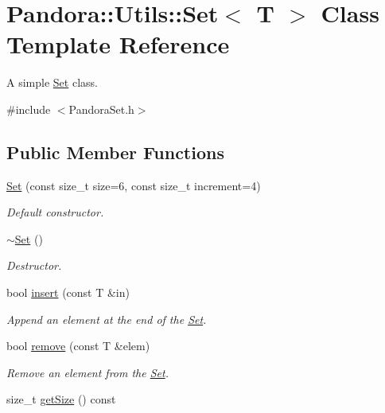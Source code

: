 \hypertarget{classPandora_1_1Utils_1_1Set}{
\section{Pandora::Utils::Set$<$ T $>$ Class Template Reference}
\label{classPandora_1_1Utils_1_1Set}
}


A simple \hyperlink{classPandora_1_1Utils_1_1Set}{Set} class.  


{\ttfamily \#include $<$PandoraSet.h$>$}\subsection*{Public Member Functions}
\begin{DoxyCompactItemize}
\item 
\hyperlink{classPandora_1_1Utils_1_1Set_ad0e4e02f649fcefffe61115758e1261c}{Set} (const size\_\-t size=6, const size\_\-t increment=4)
\begin{DoxyCompactList}\small\item\em Default constructor. \item\end{DoxyCompactList}\item 
\hyperlink{classPandora_1_1Utils_1_1Set_a51d05d5d31cb8c16b510262737969f0e}{$\sim$Set} ()
\begin{DoxyCompactList}\small\item\em Destructor. \item\end{DoxyCompactList}\item 
bool \hyperlink{classPandora_1_1Utils_1_1Set_a2c43d731fac0319a5be8c055aae33c8b}{insert} (const T \&in)
\begin{DoxyCompactList}\small\item\em Append an element at the end of the \hyperlink{classPandora_1_1Utils_1_1Set}{Set}. \item\end{DoxyCompactList}\item 
bool \hyperlink{classPandora_1_1Utils_1_1Set_a5094548bb7e9ac74ebc29ae0c4f426a5}{remove} (const T \&elem)
\begin{DoxyCompactList}\small\item\em Remove an element from the \hyperlink{classPandora_1_1Utils_1_1Set}{Set}. \item\end{DoxyCompactList}\item 
size\_\-t \hyperlink{classPandora_1_1Utils_1_1Set_a80998fcb33af9bcd8ef6549f107ee1f6}{getSize} () const 

\end{DoxyCompactItemize}
